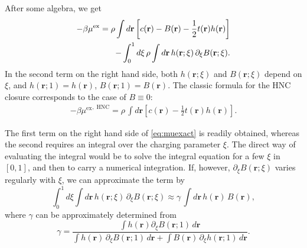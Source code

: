 \documentclass[aip,jcp,reprint,superscriptaddress]{revtex4-1}
\newcommand{\vct}[1]{\mathbf{#1}}
\providecommand{\vr}{} %
\renewcommand{\vr}{\vct{r}}
\newcommand{\supex}[1]{ { { #1 }^{ \mathrm{ex} } } }
\newcommand{\muex}{\supex{\mu}}
\begin{document}
After some algebra, we get
%
\begin{align}
  -\beta \muex =
  \rho \int d\vr \left[
    c(\vr) - B(\vr) - \frac{1}{2} t(\vr) h(\vr)
  \right]
  \notag \\
    -
  \int_0^1 d\xi \,
  \rho \int d\vr
    \, h(\vr; \xi) \, \partial_\xi B(\vr; \xi).
  \label{eq:muexact}
\end{align}
%
In the second term on the right hand side,
both $h(\vr; \xi)$ and $B(\vr; \xi)$ depend on $\xi$,
and
$h(\vr; 1) = h(\vr)$,
$B(\vr; 1) = B(\vr)$.
%
The classic formula\cite{morita1958,morita1959,morita1960,singer1985}
for the HNC closure
corresponds to the case of $B \equiv 0$:
%
\begin{align}
  -\beta \muex^{,\; \mathrm{HNC}} =
  \rho \,
  \int d\vr \left[
    c(\vr) - \frac{1}{2} t(\vr) h(\vr)
  \right].
  \label{eq:muhnc}
\end{align}


The first term on the right hand side of \eqref{eq:muexact} is readily obtained,
whereas the second requires an integral over the charging parameter $\xi$.
%
The direct way of evaluating the integral
would be to solve the integral equation for a few $\xi$ in $[0, 1]$,
and then to carry a numerical integration.
%
If, however, $\partial_\xi B(\vr; \xi)$ varies regularly with $\xi$,
we can approximate the term by
\begin{equation}
  \int_0^1 d\xi \int d\vr
    \, h(\vr; \xi) \, \partial_\xi B(\vr; \xi)
  \approx
  \gamma \, \int d\vr \, h(\vr) \, B(\vr),
  \label{eq:approxhB}
\end{equation}
where $\gamma$ can be approximately determined from
%
\begin{equation}
  \gamma
=
  \frac{ \int h(\vr) \partial_\xi B(\vr; 1) \, d\vr}
  {\int h(\vr) \, \partial_\xi B(\vr; 1) \, d\vr
   +\int B(\vr) \, \partial_\xi  h(\vr; 1) \, d\vr}.
   \label{eq:gamma_muv}
\end{equation}
\end{document}
